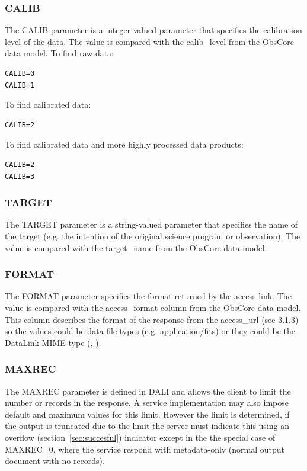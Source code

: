 \documentclass[11pt,a4paper]{ivoa}
\begin{document}
\subsubsection{CALIB}
The CALIB parameter is a integer-valued parameter that specifies the calibration level of the data. The value is compared with the calib\_level from the ObsCore data model. To find raw data:

\begin{lstlisting}
CALIB=0
CALIB=1
\end{lstlisting}
To find calibrated data:

\begin{lstlisting}
CALIB=2
\end{lstlisting}
To find calibrated data and more highly processed data products:

\begin{lstlisting}
CALIB=2
CALIB=3
\end{lstlisting}

\subsubsection{TARGET}
The TARGET parameter is a string-valued parameter that specifies the name of the target (e.g. the intention of the original science program or observation). The value is compared with the target\_name from the ObsCore data model.

\subsubsection{FORMAT}
The FORMAT parameter specifies the  format returned by  the access  link.  The value is compared with the access\_format column from the ObsCore data model. This column describes the format of the response from the access\_url (see 3.1.3) so the values could be data file types (e.g. application/fits) or they could be the DataLink  MIME type (\cite{std:DataLink}, \cite{std:TSV}).  

\subsubsection{MAXREC}
The MAXREC parameter is defined in DALI and allows the client to limit the number or records in the response. A service implementation may also impose default and maximum values for this limit. However the limit is determined, if the output is truncated due to the limit the server must indicate this using an overflow  (section~\ref{sec:succesful}) indicator except in the the special case of MAXREC=0, where the  service respond with metadata-only (normal output document with no records).
\end{document}
